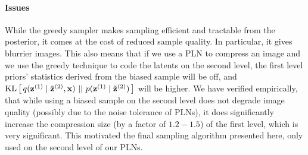 \paragraph{Issues}
While the greedy sampler makes sampling efficient and tractable from the
posterior, it comes at the cost of reduced sample quality. In particular, it
gives blurrier images. This also means that if we use a PLN to compress an
image and we use the greedy technique to code the latents on the second level,
the first level priors' statistics derived from the biased sample will be off,
and $\mathrm{KL}\left[\,q(\mathbf{z}^{(1)} \mid \tilde{\mathbf{z}}^{(2)}, \mathbf{x})\,\,||\,\,p(\mathbf{z}^{(1)} \mid
  \tilde{\mathbf{z}}^{(2)})\,\right]$ will be higher. We have verified empirically, that while
using a biased sample on the second level does not degrade image quality
(possibly due to the noise tolerance of PLNs), it does significantly increase
the compression size (by a factor of $1.2 - 1.5$) of the first level, which is
very significant. This motivated the final sampling algorithm presented here,
only used on the second level of our PLNs.

